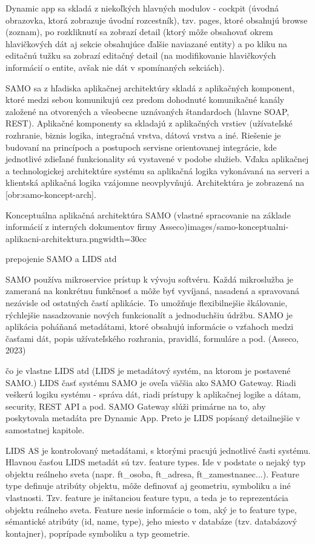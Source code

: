 Dynamic app sa skladá z niekoľkých hlavných modulov - cockpit (úvodná obrazovka, ktorá zobrazuje úvodní rozcestník), tzv. pages, ktoré obsahujú browse (zoznam), po rozkliknutí sa zobrazí detail (ktorý môže obsahovať okrem hlavičkových dát aj sekcie obsahujúce ďalšie naviazané entity) a po kliku na editačnú tužku sa zobrazí editačný detail (na modifikovanie hlavičkových informácií o entite, avšak nie dát v spomínaných sekciách).

SAMO sa z hľadiska aplikačnej architektúry skladá z aplikačných komponent, ktoré medzi sebou komunikujú cez predom dohodnuté komunikačné kanály založené na otvorených a všeobecne uznávaných štandardoch (hlavne SOAP, REST). Aplikačné komponenty sa skladajú z aplikačných vrstiev (užívateľské rozhranie, biznis logika, integračná vrstva, dátová vrstva a iné. Riešenie je budovaní na princípoch a postupoch servisne orientovanej integrácie, kde jednotlivé zdieľané funkcionality sú vystavené v podobe služieb. Vďaka aplikačnej a technologickej architektúre systému sa aplikačná logika vykonávaná na serveri a klientská aplikačná logika vzájomne neovplyvňujú. Architektúra je zobrazená na [obr:samo-koncept-arch].

{Konceptuálna aplikačná architektúra SAMO (vlastné spracovanie na základe informácií z interných dokumentov firmy Asseco)}{images/samo-konceptualni-aplikacni-architektura.png}{width=30cc}

\TODO prepojenie SAMO a LIDS atd

SAMO používa mikroservice prístup k vývoju softvéru. Každá mikroslužba je zameraná na konkrétnu funkčnosť a môže byť vyvíjaná, nasadená a spravovaná nezávisle od ostatných častí aplikácie. To umožňuje flexibilnejšie škálovanie, rýchlejšie nasadzovanie nových funkcionalít a jednoduchšiu údržbu. SAMO je aplikácia poháňaná metadátami, ktoré obsahujú informácie o vzťahoch medzi časťami  dát, popis užívateľského rozhrania, pravidlá, formuláre a pod. \scr(Asseco, 2023)


\TODO čo je vlastne LIDS atd (LIDS je metadátový systém, na ktorom je postavené SAMO.)
LIDS časť systému SAMO je oveľa väčšia ako SAMO Gateway. Riadi veškerú logiku systému - správa dát, riadi prístupy k aplikačnej logike a dátam, security, REST API a pod. SAMO Gateway slúži primárne na to, aby poskytovala metadáta pre Dynamic App. Preto je LIDS popísaný detailnejšie v samostatnej kapitole.

LIDS AS je kontrolovaný metadátami, s ktorými pracujú jednotlivé časti systému. Hlavnou časťou LIDS metadát sú tzv. feature types. Ide v podstate o nejaký typ objektu reálneho sveta (napr. ft\_osoba, ft\_adresa, ft\_zamestnanec...). Feature type definuje atribúty objektu, môže definovať aj geometriu, symboliku a iné vlastnosti. Tzv. feature je inštanciou feature typu, a teda je to reprezentácia objektu reálneho sveta. Feature nesie informácie o tom, aký je to feature type, sémantické atribúty (id, name, type), jeho miesto v databáze (tzv. databázový kontajner), poprípade symboliku a typ geometrie.

